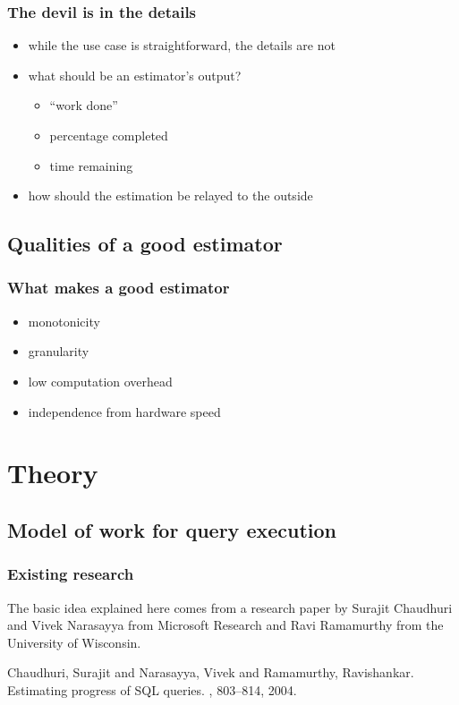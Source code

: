 \documentclass{beamer}
\begin{document}
\begin{frame}
  \frametitle{The devil is in the details}

  \begin{itemize}
  \item while the use case is straightforward, the details are not
  \item what should be an estimator's output?
    \begin{itemize}
    \item ``work done''
    \item percentage completed
    \item time remaining
    \end{itemize}
  \item how should the estimation be relayed to the outside
  \end{itemize}
\end{frame}

\subsection{Qualities of a good estimator}

\begin{frame}
  \frametitle{What makes a good estimator}

  \begin{itemize}
  \item monotonicity
  \item granularity
  \item low computation overhead
  \item independence from hardware speed
  \end{itemize}
\end{frame}

\section{Theory}
\subsection{Model of work for query execution}

\begin{frame}
  \frametitle{Existing research}

  The basic idea explained here comes from a research paper by Surajit
  Chaudhuri and Vivek Narasayya from Microsoft Research and Ravi Ramamurthy
  from the University of Wisconsin.

  \bigskip

  \begin{thebibliography}{Chaudhuri 2004}

    Chaudhuri, Surajit and Narasayya, Vivek and Ramamurthy, Ravishankar.
    \newblock Estimating progress of SQL queries.
    , 803--814, 2004.

  \end{thebibliography}
\end{frame}
\end{document}
